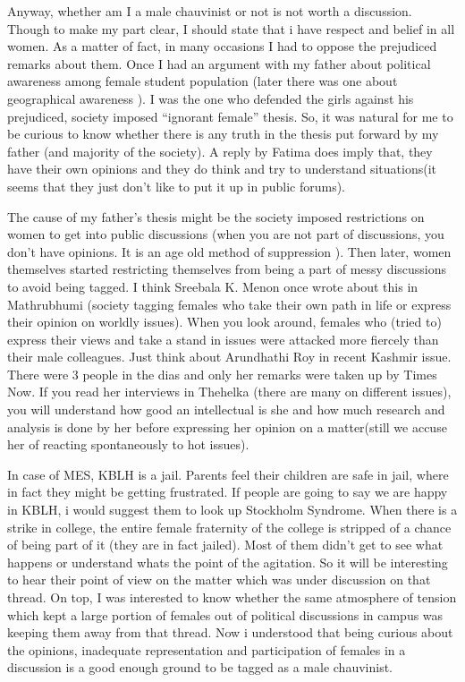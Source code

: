 Anyway, whether am I a male chauvinist or not is not worth a discussion. Though to make my part clear, I should state that i have respect and belief in all women. As a matter of fact, in many occasions I had to oppose the prejudiced remarks about them. Once I had an argument with my father about political awareness among female student population (later there was one about geographical awareness ). I was the one who defended the girls against his prejudiced, society imposed “ignorant female” thesis. So, it was natural for me to be curious to know whether there is any truth in the thesis put forward by my father (and majority of the society). A reply by Fatima does imply that, they have their own opinions and they do think and try to understand situations(it seems that they just don’t like to put it up in public forums).

The cause of my father’s thesis might be the society imposed restrictions on women to get into public discussions (when you are not part of discussions, you don’t have opinions. It is an age old method of suppression ). Then later, women themselves started restricting themselves from being a part of messy discussions to avoid being tagged. I think Sreebala K. Menon once wrote about this in Mathrubhumi (society tagging females who take their own path in life or express their opinion on worldly issues). When you look around, females who (tried to) express their views and take a stand in issues were attacked more fiercely than their male colleagues. Just think about Arundhathi Roy in recent Kashmir issue. There were 3 people in the dias and only her remarks were taken up by Times Now. If you read her interviews in Thehelka (there are many on different issues), you will understand how good an intellectual is she and how much research and analysis is done by her before expressing her opinion on a matter(still we accuse her of reacting spontaneously to hot issues).

In case of MES, KBLH is a jail. Parents feel their children are safe in jail, where in fact they might be getting frustrated. If people are going to say we are happy in KBLH, i would suggest them to look up Stockholm Syndrome. When there is a strike in college, the entire female fraternity of the college is stripped of a chance of being part of it (they are in fact jailed). Most of them didn’t get to see what happens or understand whats the point of the agitation. So it will be interesting to hear their point of view on the matter which was under discussion on that thread. On top, I was interested to know whether the same atmosphere of tension which kept a large portion of females out of political discussions in campus was keeping them away from that thread. Now i understood that being curious about the opinions, inadequate representation and participation of females in a discussion is a good enough ground to be tagged as a male chauvinist.

